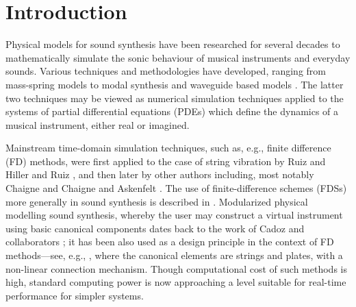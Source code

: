 \documentclass{article}
\title{\papertitle}
\begin{document}
%
\capstartfalse
\maketitle
\capstarttrue
%
\begin{abstract}
In this paper, implementation, instrument design and control issues surrounding a modular physical modelling synthesis environment are described. The environment is constructed as a network of stiff strings and a resonant plate, accompanied by user-defined connections and excitation models. The bow, in particular, is a novel feature in this setting. The system as a whole is simulated using finite difference (FD) methods. The mathematical formulation of these models is presented, alongside several new instrument designs, together with a real-time implementation in JUCE using FD methods. Control is through the Sensel Morph.  
\end{abstract}
%

\section{Introduction}\label{sec:introduction}

Physical models for sound synthesis have been researched for several decades to mathematically simulate the sonic behaviour of musical instruments and everyday sounds. Various techniques and methodologies have developed, ranging from mass-spring models \cite{cadoz79, Cadoz83, cadoz1993cordis} to modal synthesis \cite{morrison1993mosaic} and waveguide based models \cite{smith1992physical}. The latter two techniques may be viewed as numerical simulation techniques applied to the systems of partial differential equations (PDEs) which define the dynamics of a musical instrument, either real or imagined. 

Mainstream time-domain simulation techniques, such as, e.g., finite difference (FD) methods, were first applied to the case of string vibration by Ruiz \cite{Ruiz} and Hiller and Ruiz \cite{Hiller, Hiller2}, and then later by other authors \cite{Bacon} including, most notably Chaigne \cite{Chaigne92} and Chaigne and Askenfelt \cite{Chaigne}. The use of finite-difference schemes (FDSs) more generally in sound synthesis is described in \cite{Bilbao2009:NumericalSoundSynthesis}. Modularized physical modelling sound synthesis, whereby the user may construct a virtual instrument using basic canonical components dates back to the work of Cadoz and collaborators \cite{cadoz79, Cadoz83, cadoz1993cordis}; it has been also used as a design principle in the context of FD methods---see, e.g., \cite{Bilbao2009:ModularPercussion, Bilbaosmc14, Webb2015}, where the canonical elements are strings and plates, with a non-linear connection mechanism.  Though computational cost of such methods is high, standard computing power is now approaching a level suitable for real-time performance for simpler systems.  
\end{document}
